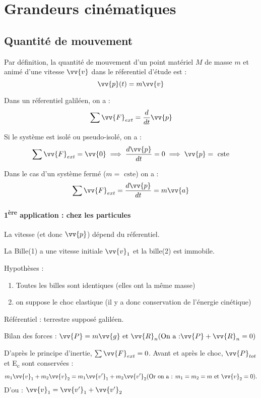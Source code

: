 \chapter{Grandeurs cinématiques}
\section{Quantité de mouvement}

\begin{definition}
    Par définition, la quantité de mouvement d'un point matériel \(M\) de masse \(m\) et animé d'une vitesse \(\vv{v}\) dans le réferentiel d'étude est :
    \[
        \vv{p}(t) = m\vv{v}
    \] 
\end{definition}

\begin{theorem}
    Dans un réferentiel galiléen, on a : 
    \[
        \sum \vv{F}_{ext} = \frac{d}{dt}\vv{p}
    \]
\end{theorem}

\begin{corollary}
    Si le système est isolé ou pseudo-isolé, on a : 
    \[
        \sum \vv{F}_{ext} = \vv{0} \implies \frac{d\vv{p}}{dt} = 0 \implies  \vv{p} = \text{ cste}
    \]
\end{corollary}

\begin{corollary}
    Dans le cas d'un système fermé (\(m= \text{ cste}\)) on a : 
    \[
        \sum \vv{F}_{ext} = \frac{d\vv{p}}{dt} = m\vv{a}
    \]
\end{corollary}

\subsubsection{1\textsuperscript{ère} application : chez les particules}

La vitesse (et donc $\vv{p}$) dépend du réferentiel. \par
La Bille(1) a une vitesse initiale $\vv{v}_1$ et la bille(2) est immobile. \par
Hypothèses : 
\begin{enumerate}
    \item Toutes les billes sont identiques (elles ont la même masse)
    \item on suppose le choc elastique (il y a donc conservation de l'énergie cinétique)
\end{enumerate}
Référentiel : terrestre supposé galiléen. \par
Bilan des forces : $\vv{P} = m\vv{g} \text{ et } \vv{R}_n (\text{On a :} \vv{P}+\vv{R}_n = 0)$ \par
D'après le principe d'inertie, $\sum \vv{F}_{ext} = 0$. Avant et après le choc, $\vv{P}_{tot}$ et E\textsubscript{c} sont conservées : 
\[
m_1\vv{v}_1 + m_2 \vv{v}_2 = m_1 \vv{v'}_1 + m_2 \vv{v'}_2 (\text{Or on a : } m_1 = m_2 = m \text{ et } \vv{v}_2 =0) 
.\] 
D'ou : $\vv{v}_1 = \vv{v'}_1 +\vv{v'}_2$

